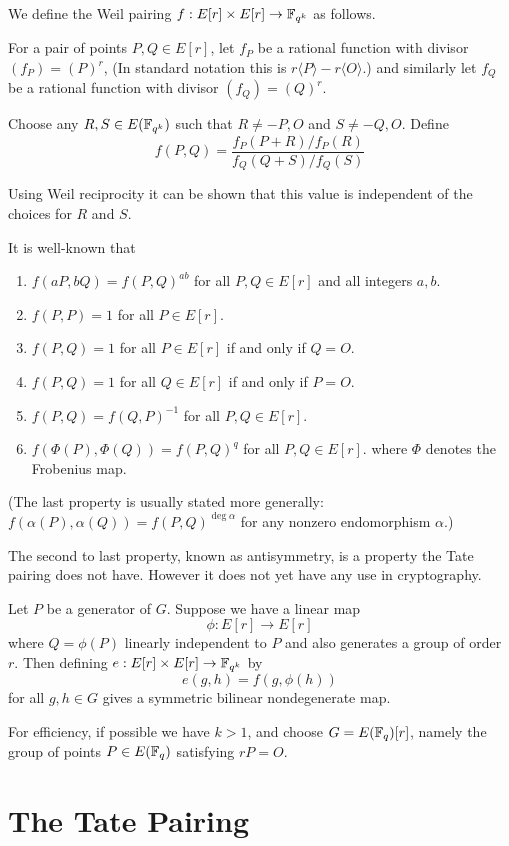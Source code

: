 We define the Weil pairing
$f:E[r] \times E[r] \rightarrow \mathbb{F}_{q^k}$ as follows.

For a pair of points $P, Q \in E[r]$,
let $f_P$ be a rational function with divisor $(f_P) = (P)^r$,
(In standard notation this is $r\langle P\rangle  - r\langle O\rangle$.)
and similarly let $f_Q$ be a rational function with divisor $(f_Q) = (Q)^r$.

Choose any $R, S \in E(\mathbb{F}_{q^k})$ such that $R \ne -P, O$ and $S \ne -Q, O$.
Define
\[ f(P,Q) = \frac{f_P(P+R)/f_P(R)}{f_Q(Q+S)/f_Q(S)} \]

Using Weil reciprocity it can be shown that this value is independent
of the choices for $R$ and $S$.

It is well-known that
\begin{enumerate}
\item
$f(a P, b Q) = f(P,Q)^{a b}$ for all $P, Q \in E[r]$ and all integers $a, b$.
\item
$f(P,P) = 1$ for all $P \in E[r]$.
\item
$f(P,Q) = 1$ for all $P \in E[r]$ if and only if $Q = O$.
\item
$f(P,Q) = 1$ for all $Q \in E[r]$ if and only if $P = O$.
\item
$f(P,Q) = f(Q,P)^{-1}$ for all $P,Q \in E[r]$.
\item
$f(\Phi(P),\Phi(Q)) = f(P,Q)^{q}$ for all $P,Q \in E[r]$.
where $\Phi$ denotes the Frobenius map.
\end{enumerate}

(The last property is usually stated more generally:
$f(\alpha(P),\alpha(Q)) = f(P,Q)^{\deg \alpha}$ for any nonzero
endomorphism $\alpha$.)

The second to last property, known as antisymmetry, is a property the
Tate pairing does not have. However it does not yet have
any use in cryptography.

Let $P$ be a generator of $G$. Suppose
we have a linear map
\[ \phi : E[r] \rightarrow E[r] \]
where $Q = \phi(P)$ linearly independent to $P$ and also generates
a group of order $r$.
Then defining $e:E[r]\times E[r]\rightarrow \mathbb{F}_{q^k}$ by
\[ e(g,h) = f(g,\phi(h)) \]
for all $g, h \in G$
gives a symmetric bilinear nondegenerate map.

For efficiency, if possible we have $k > 1$, and choose
$G = E(\mathbb{F}_q)[r]$, namely the
group of points $P \in E(\mathbb{F}_q)$ satisfying $r P = O$.

\section {The Tate Pairing }

